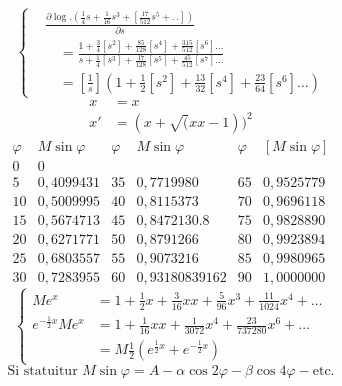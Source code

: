 \begingroup
\setlength{\headheight}{25pt}
\makeatletter\tagsleft@true\let\veqno\@@leqno\makeatother
{}
{\small\begin{equation}\tag*{[29]}\left\{\begin{aligned}
&\frac{\partial\log.\left(\frac14s+\frac1{16}s^3+\left[\frac{17}{512}s^5+.\,.\right]\right)}{\partial s}\\
&\quad=\frac{1+\frac34[s^2]+\frac{85}{128}[s^4]+\frac{315}{512}[s^6]\ldots}
{s+\frac14[s^3]+\frac{17}{128}[s^5]+\frac{45}{512}[s^7]\ldots}\\
&\quad=\left[\frac1s\right]\left(1+\frac12[s^2]+\frac{13}{32}[s^4]+\frac{23}{64}[s^6]\ldots\right)
\end{aligned}\right.\end{equation}}
\noindent [S. 13]
\[\begin{aligned}
x&=x\\
x'&=(x+\surd(xx-1))^2
\end{aligned}\]
{\small\[\begin{array}{rr|rr|rr}
\varphi&M\sin\varphi&\varphi&M\sin\varphi&\varphi&[M\sin\varphi]\\
0&0&&&&\\
5&0{,}4099431&35&0{,}7719980&65&0{,}9525779\\
10&0{,}5009995&40&0{,}8115373&70&0{,}9696118\\
15&0{,}5674713&45&0{,}8472130.8&75&0{,}9828890\\
20&0{,}6271771&50&0{,}8791266&80&0{,}9923894\\
25&0{,}6803557&55&0{,}9073216&85&0{,}9980965\\
30&0{,}7283955&60&0{,}93180839162&90&1{,}0000000
\end{array}\]}
\ClosingRule
\begin{equation}\tag*{[30]}\left\{\begin{aligned}
Me^x&=1+\frac12x+\frac3{16}xx+\frac5{96}x^3+\frac{11}{1024}x^4+\ldots\\
e^{-\frac12x}Me^x&=1+\frac1{16}xx+\frac1{3072}x^4+\frac{23}{737280}x^6+\ldots\\
&=M\frac12\left(e^{\frac12x}+e^{-\frac12x}\right)
\end{aligned}\right.\end{equation}
\begin{equation}\tag*{[31]}\text{Si statuitur }M\sin\varphi=A-\alpha\cos2\varphi-\beta\cos4\varphi-\text{etc.}\end{equation}
